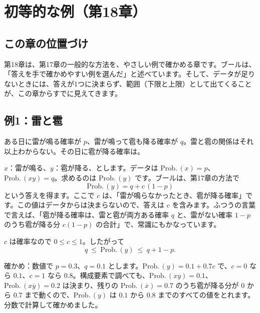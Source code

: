 \documentclass[a4paper,11pt,openany]{ltjsbook}
\newcommand{\nx}[1]{\overline{#1}}
\newcommand{\Prob}{\mathrm{Prob.}\,}
\begin{document}
\chapter{初等的な例（第18章）}

\section{この章の位置づけ}

第18章は、第17章の一般的な方法を、やさしい例で確かめる章です。ブールは、「答えを手で確かめやすい例を選んだ」と述べています。そして、データが足りないときには、答えが1つに決まらず、範囲（下限と上限）として出てくることが、この章からすでに見えてきます。

\section{例1：雷と雹}

ある日に雷が鳴る確率が $p$、雷が鳴って雹も降る確率が $q$。雷と雹の関係はそれ以上わからない。その日に雹が降る確率は。

$x$：雷が鳴る、$y$：雹が降る、とします。データは $\Prob(x)=p$、$\Prob(xy)=q$。求めるのは $\Prob(y)$ です。ブールは、第17章の方法で
\[
\Prob(y)=q+c\,(1-p)
\]
という答えを得ます。ここで $c$ は、「雷が鳴らなかったとき、雹が降る確率」です。この値はデータからは決まらないので、答えは $c$ を含みます。ふつうの言葉で言えば、「雹が降る確率は、雷と雹が両方ある確率 $q$ と、雷がない確率 $1-p$ のうち雹が降る分 $c(1-p)$ の合計」で、常識にもかなっています。

$c$ は確率なので $0\le c\le1$。したがって
\[
q\ \le\ \Prob(y)\ \le\ q+1-p .
\]

\begin{examplebox}{確かめ：数値で}
$p=0.3$、$q=0.1$ とします。$\Prob(y)=0.1+0.7c$ で、$c=0$ なら $0.1$、$c=1$ なら $0.8$。構成要素で調べても、$\Prob(xy)=0.1$、$\Prob(x\nx y)=0.2$ は決まり、残りの $\Prob(\nx x)=0.7$ のうち雹が降る分が $0$ から $0.7$ まで動くので、$\Prob(y)$ は $0.1$ から $0.8$ までのすべての値をとれます。分数で計算して確かめました。
\end{examplebox}
\end{document}
